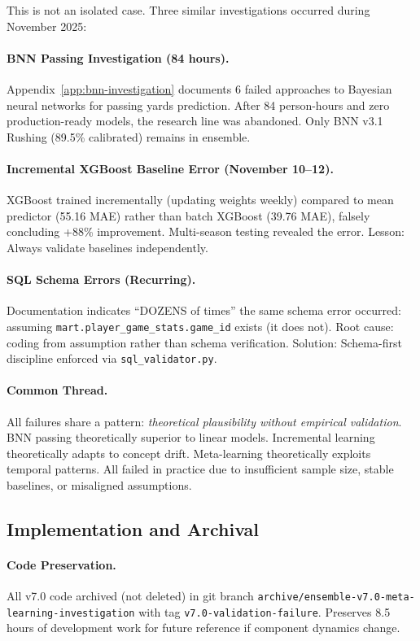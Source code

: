 This is not an isolated case. Three similar investigations occurred during November 2025:

\paragraph{BNN Passing Investigation (84 hours).}
Appendix~\ref{app:bnn-investigation} documents 6 failed approaches to Bayesian neural networks for passing yards prediction. After 84 person-hours and zero production-ready models, the research line was abandoned. Only BNN v3.1 Rushing (89.5\% calibrated) remains in ensemble.

\paragraph{Incremental XGBoost Baseline Error (November 10--12).}
XGBoost trained incrementally (updating weights weekly) compared to mean predictor (55.16 MAE) rather than batch XGBoost (39.76 MAE), falsely concluding +88\% improvement. Multi-season testing revealed the error. Lesson: Always validate baselines independently.

\paragraph{SQL Schema Errors (Recurring).}
Documentation indicates ``DOZENS of times'' the same schema error occurred: assuming \texttt{mart.player\_game\_stats.game\_id} exists (it does not). Root cause: coding from assumption rather than schema verification. Solution: Schema-first discipline enforced via \texttt{sql\_validator.py}.

\paragraph{Common Thread.}
All failures share a pattern: \textit{theoretical plausibility without empirical validation}. BNN passing theoretically superior to linear models. Incremental learning theoretically adapts to concept drift. Meta-learning theoretically exploits temporal patterns. All failed in practice due to insufficient sample size, stable baselines, or misaligned assumptions.

\subsection{Implementation and Archival}

\paragraph{Code Preservation.}
All v7.0 code archived (not deleted) in git branch \texttt{archive/ensemble-v7.0-meta-learning-investigation} with tag \texttt{v7.0-validation-failure}. Preserves 8.5 hours of development work for future reference if component dynamics change.

